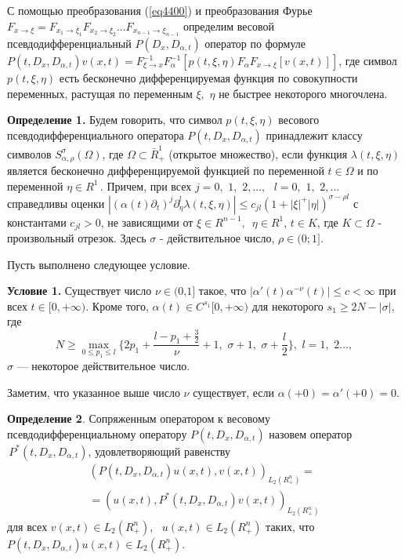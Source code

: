 {С помощью преобразования (\ref{eq4400}) и преобразования Фурье $F_{x \to \xi } = F_{x_1
\to \xi _1 } F_{x_2 \to \xi _2 } ...F_{x_{n - 1} \to \xi _{n - 1} } $
определим весовой псевдодифференциальный $P(D_x ,D_{\alpha ,t} )$ оператор
по формуле $P(t,D_x ,D_{\alpha ,t} )v(x,t) = F_{\xi \to x}^{ - 1} F_\alpha
^{ - 1} [p(t,\xi ,\eta )F_\alpha F_{x \to \xi } [v(x,t)]]$,
где символ $p(t,\xi ,\eta )$ есть бесконечно дифференцируемая функция по
совокупности переменных, растущая по переменным $\xi ,\,\,\eta $ не быстрее
некоторого многочлена.

\textbf{Определение 1.} Будем говорить, что символ $p(t,\xi ,\eta )$
весового псевдодифференциального оператора $P(t,D_x ,D_{\alpha ,t} )$
принадлежит классу символов $S_{\alpha ,\rho }^\sigma (\Omega )$, где
$\Omega \subset \bar {R}_ + ^1 $ (открытое множество), если функция $\lambda
(t,\xi ,\eta )$ является бесконечно дифференцируемой функцией по переменной
$t \in \Omega $ и по переменной $\eta \in R^1\,$. Причем, при всех $j =
0,\,\,1,\,\,2,...,\,\,\,\,l = 0,\,\,1,\,\,2,...$ справедливы оценки $\left|
{(\alpha (t)\partial _t )^j\partial _\eta ^l \lambda (t,\xi ,\eta )} \right|
\le c_{jl} (1 + \left| \xi \right|^ + \left| \eta \right|)^{\sigma - \rho
l}$ с константами $c_{jl} > 0$, не зависящими от $\xi \in R^{n -
1},\,\,\,\eta \in R^1$, $t \in K$, где $K \subset \Omega $ - произвольный
отрезок. Здесь $\sigma $ - действительное число, $\rho \in (0;1]$.

Пусть выполнено следующее условие.

\textbf{Условие 1.} Существует число $\nu \in \mbox{(0,1]}$ такое, что
$\left| {\alpha '(t)\alpha ^{ - \nu }(t)} \right| \le c < \infty $ при всех
$t \in [0, + \infty )$. Кроме того, $\alpha (t) \in C^{s_1 }[0, + \infty )$
для некоторого $s_1 \ge 2N - \left| \sigma \right|$, где
\[
N \ge \mathop {\max }\limits_{0 \le p_1 \le l} \{2p_1 + \frac{l - p_1 +
\frac{3}{2}}{\nu } + 1,\,\,\sigma + 1,\,\,\sigma + \frac{l}{2}\},\,\,l =
1,\,\,2...,
\]
$\sigma$ --- некоторое действительное число.



Заметим, что указанное выше число $\nu $ существует, если $\alpha ( + 0) =
\alpha '( + 0) = 0$.

\textbf{Определение 2}. Сопряженным оператором к весовому
псевдодифференциальному оператору $P(t,D_x ,D_{\alpha ,t} )$ назовем
оператор $\,P^\ast (t,D_x ,D_{\alpha ,t} )$, удовлетворяющий равенству
\begin{multline*}
(P(t,D_x ,D_{\alpha ,t} )u(x,t),v(x,t))_{L_2 (R_ + ^n )} =
\\=
(u(x,t),P^\ast
(t,D_x ,D_{\alpha ,t} )v(x,t))_{L_2 (R_ + ^n )}
\end{multline*}
для всех $v(x,t) \in L_2 (R_ + ^n ),\,\,\,\,u(x,t) \in L_2 (R_ + ^n )$
таких, что $P(t,D_x ,D_{\alpha ,t} )u(x,t) \in L_2 (R_ + ^n )$.

}
